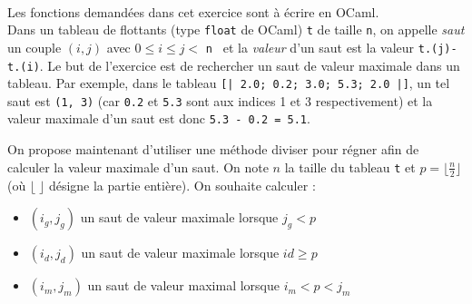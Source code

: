 \documentclass[11pt,a4paper]{article}
\begin{document}
\begin{Exercise}[title={Saut de valeur maximale}, origin={\bac {\sc capes nsi 2023}}]\\
Les fonctions demandées dans cet exercice sont à écrire en OCaml. \smallskip \\
Dans un tableau de flottants (type {\tt float} de OCaml) {\tt t} de taille {\tt n}, on appelle \textit{saut} un couple $(i,j)$ avec $0 \leq i \leq j <$ {\tt n  } et la \textit{valeur} d'un saut est la valeur {\tt t.(j)-t.(i)}. Le but de l'exercice est de rechercher un saut de valeur maximale dans un tableau. Par exemple, dans le tableau {\tt [| 2.0; 0.2; 3.0; 5.3; 2.0 |]}, un tel saut est {\tt (1, 3)} (car {\tt 0.2} et {\tt 5.3} sont aux indices 1 et 3 respectivement) et la valeur maximale d'un saut est donc {\tt 5.3 - 0.2 = 5.1}.




\medskip

On propose maintenant d'utiliser une méthode diviser pour régner afin de calculer la valeur maximale d'un saut. On note $n$ la taille du tableau {\tt t} et $p = \lfloor \frac{n}{2} \rfloor$ (où $\lfloor \; \rfloor$ désigne la partie entière). On souhaite calculer :
\begin{itemize}
    \item $(i_g,j_g)$ un saut de valeur maximale lorsque $j_g < p$
    \item $(i_d,j_d)$ un saut de valeur maximale lorsque $id \geqslant p$
    \item $(i_m,j_m)$ un saut de valeur maximal lorsque $i_m < p < j_m$
\end{itemize}


\end{Exercise}
\end{document}
